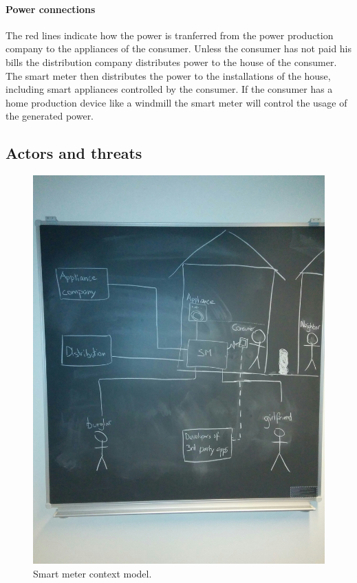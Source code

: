 \paragraph{Power connections}
The red lines indicate how the power is tranferred from the power production company to the appliances of the consumer.
Unless the consumer has not paid his bills the distribution company distributes power to the house of the consumer.
The smart meter then distributes the power to the installations of the house, including smart appliances controlled by the consumer.
If the consumer has a home production device like a windmill the smart meter will control the usage of the generated power.

\subsection{Actors and threats}
\begin{figure}
  \includegraphics[width=\textwidth]{figures/situation.jpg}
  \caption{Smart meter context model.}
  \label{sm_model}
\end{figure}

